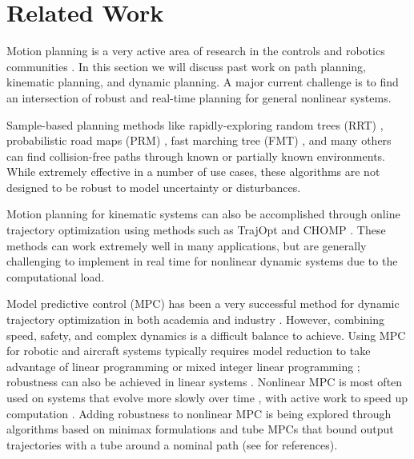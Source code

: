 \section{Related Work \label{sec:relatedwork}}
Motion planning is a very active area of research in the controls and robotics communities \cite{Hoy2015}.  In this section we will discuss past work on path planning, kinematic planning, and dynamic planning.  A major current challenge is to find an intersection of robust and real-time planning for general nonlinear systems. 

Sample-based planning methods like rapidly-exploring random trees (RRT) \cite{Kuffner2000}, probabilistic road maps (PRM) \cite{Kavraki1996}, fast marching tree (FMT) \cite{Janson2015}, and many others \cite{Richter2016, Karaman2011, Kobilarov2012} can find collision-free paths through known or partially known environments. While extremely effective in a number of use cases, these algorithms are not designed to be robust to model uncertainty or disturbances.

Motion planning for kinematic systems can also be accomplished through online trajectory optimization using methods such as TrajOpt \cite{Schulman2013} and CHOMP \cite{Ratliff2009}. These methods can work extremely well in many applications, but are generally challenging to implement in real time for nonlinear dynamic systems due to the computational load.

Model predictive control (MPC) has been a very successful method for dynamic trajectory optimization in both academia and industry \cite{Qin2003}.  However, combining speed, safety, and complex dynamics is a difficult balance to achieve. Using MPC for robotic and aircraft systems typically requires model reduction to take advantage of linear programming or mixed integer linear programming \cite{Vitus2008, Zeilinger2011, Richter2012}; robustness can also be achieved in linear systems \cite{Richards2006, DiCairano2016}. Nonlinear MPC is most often used on systems that evolve more slowly over time \cite{Diehl2002, Schildbach2016}, with active work to speed up computation \cite{Diehl2009, Neunert2016}. Adding robustness to nonlinear MPC is being explored through algorithms based on minimax formulations and tube MPCs that bound output trajectories with a tube around a nominal path (see \cite{Hoy2015} for references).


